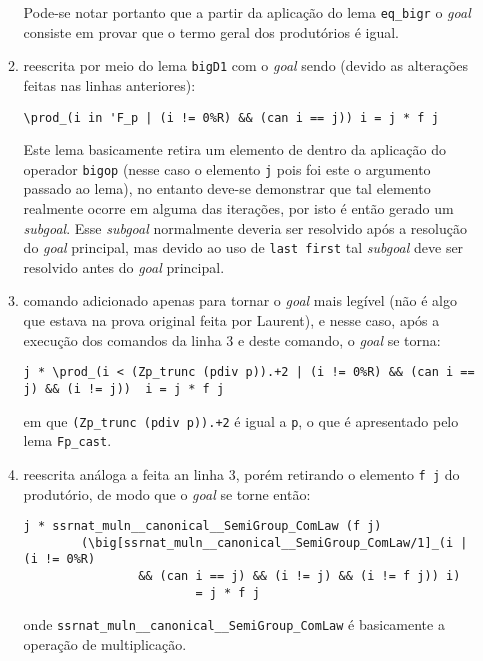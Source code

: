 \begin{enumerate}[label=\textbf{\roman*.}]
\begin{enumerate}
                Pode-se notar portanto que a partir da aplicação do lema \lstinline[language=coq]|eq_bigr| o \textit{goal} consiste em provar que o termo geral dos produtórios é igual.

                \item[\textbf{(3)}] reescrita por meio do lema \lstinline[language=coq]|bigD1| com o \textit{goal} sendo (devido as alterações feitas nas linhas anteriores):
                        \begin{lstlisting}[language=coq,frame=single,tabsize=1]
\prod_(i in 'F_p | (i != 0%R) && (can i == j)) i = j * f j
                        \end{lstlisting}
                Este lema basicamente retira um elemento de dentro da aplicação do operador \lstinline[language=coq]|bigop| (nesse caso o elemento \lstinline[language=coq]|j| pois foi este o argumento passado ao lema), no entanto deve-se demonstrar que tal elemento realmente ocorre em alguma das iterações, por isto é então gerado um \textit{subgoal}. Esse \textit{subgoal} normalmente deveria ser resolvido após a resolução do \textit{goal} principal, mas devido ao uso de \lstinline[language=coq]|last first| tal \textit{subgoal} deve ser resolvido antes do \textit{goal} principal.
                
                \item[\textbf{(5)}] comando adicionado apenas para tornar o \textit{goal} mais legível (não é algo que estava na prova original feita por Laurent), e nesse caso, após a execução dos comandos da linha 3 e deste comando, o \textit{goal} se torna:
                        \begin{lstlisting}[language=coq,frame=single,tabsize=1]
j * \prod_(i < (Zp_trunc (pdiv p)).+2 | (i != 0%R) && (can i == j) && (i != j))  i = j * f j
                        \end{lstlisting}
                em que \lstinline[language=coq]|(Zp_trunc (pdiv p)).+2| é igual a \lstinline[language=coq]|p|, o que é apresentado pelo lema \lstinline[language=coq]|Fp_cast|.

                \item[\textbf{(6)}] reescrita análoga a feita an linha 3, porém retirando o elemento \lstinline[language=coq]|f j| do produtório, de modo que o \textit{goal} se torne então:
                        \begin{lstlisting}[language=coq,frame=single,tabsize=1]
j * ssrnat_muln__canonical__SemiGroup_ComLaw (f j)
        (\big[ssrnat_muln__canonical__SemiGroup_ComLaw/1]_(i | (i != 0%R) 
                && (can i == j) && (i != j) && (i != f j)) i) 
                        = j * f j
                        \end{lstlisting}
                onde \lstinline[language=coq]|ssrnat_muln__canonical__SemiGroup_ComLaw| é basicamente a operação de multiplicação.


\end{enumerate}
\end{enumerate}
